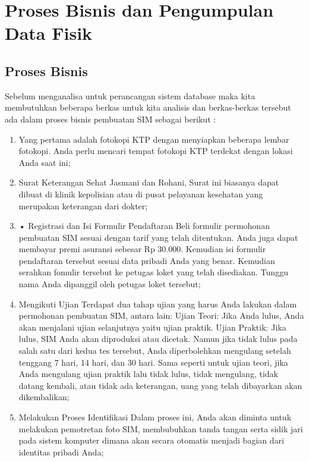 \chapter{Proses Bisnis dan Pengumpulan Data Fisik}

\section{Proses Bisnis}
Sebelum menganalisa untuk perancangan sistem database maka kita membutuhkan beberapa berkas untuk kita analisis dan berkas-berkas tersebut ada dalam proses bisnis pembuatan SIM sebagai berikut :
\begin{enumerate}
	\item Yang pertama adalah fotokopi KTP dengan menyiapkan beberapa lembar fotokopi. Anda perlu mencari tempat fotokopi KTP terdekat dengan lokasi Anda saat ini;

	\item Surat Keterangan Sehat Jasmani dan Rohani,
    Surat ini biasanya dapat dibuat di klinik kepolisian atau di pusat pelayanan kesehatan yang merupakan keterangan dari dokter;

	\item •	Registrasi dan Isi Formulir Pendaftaran
	Beli formulir permohonan pembuatan SIM sesuai dengan tarif yang telah ditentukan. Anda juga dapat membayar premi asuransi sebesar Rp 30.000. Kemudian isi formulir pendaftaran tersebut sesuai data pribadi Anda yang benar. Kemudian serahkan fomulir tersebut ke petugas loket yang telah disediakan. Tunggu nama Anda dipanggil oleh petugas loket tersebut;

	\item Mengikuti Ujian
	Terdapat dua tahap ujian yang harus Anda lakukan dalam permohonan pembuatan SIM, antara lain:
	Ujian Teori: Jika Anda lulus, Anda akan menjalani ujian selanjutnya yaitu ujian praktik.
	Ujian Praktik: Jika lulus, SIM Anda akan diproduksi atau dicetak.
	Namun jika tidak lulus pada salah satu dari kedua tes tersebut, Anda diperbolehkan mengulang setelah tenggang 7 hari, 14 hari, dan 30 hari. Sama seperti untuk ujian teori, jika Anda mengulang ujian praktik lalu tidak lulus, tidak mengulang, tidak datang kembali, atau tidak ada keterangan, uang yang telah dibayarkan akan dikembalikan;

    \item Melakukan Proses Identifikasi
    Dalam proses ini, Anda akan diminta untuk melakukan pemotretan foto SIM, membubuhkan tanda tangan serta sidik jari pada sistem komputer dimana akan secara otomatis menjadi bagian dari identitas pribadi Anda;


\end{enumerate}
